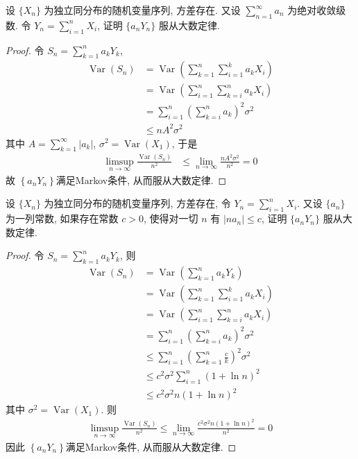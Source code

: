\documentclass[../main.tex]{subfiles}
\begin{document}
\begin{exercise}{}{}
设 $\{X_n\}$ 为独立同分布的随机变量序列, 方差存在. 又设 $\sum_{n=1}^\infty a_n$ 为绝对收敛级数. 令 $Y_n = \sum_{i=1}^n X_i$, 证明 $\{a_n Y_n\}$ 服从大数定律.
\end{exercise}
\begin{proof}
令 $S_{n}= \sum _{k= 1}^{n}a_{k}Y_{k}$, 
 $$ \begin{aligned} \operatorname{Var}\left(S_{n}\right)&= \operatorname{Var}\left(\sum _{k= 1}^{n}\sum _{i= 1}^{k}a_{k}X_{i}\right)\\&= \operatorname{Var}\left(\sum _{i= 1}^{n}\sum _{k= i}^{n}a_{k}X_{i}\right)\\&= \sum _{i= 1}^{n}\left(\sum _{k= i}^{n}a_{k}\right)^{2}\sigma ^{2}\\&\le n A^{2}\sigma ^{2}\end{aligned} $$
 其中 $A= \sum _{k= 1}^{\infty}\left| a_{k} \right|$, $\sigma ^{2}= \operatorname{Var}\left(X_{1}\right)$, 于是  
$$ \begin{aligned} \limsup_{n\to \infty}\frac{\operatorname{Var}\left(S_{n}\right) }{n^{2} } &\le \lim_{n\to \infty}\frac{nA^{2}\sigma ^{2} }{ n^{2}}= 0\end{aligned} $$ 
故 $\left\{ a_{n}Y_{n} \right\}$满足Markov条件, 从而服从大数定律.  
\end{proof}
\begin{exercise}{}{}
设 $\{X_n\}$ 为独立同分布的随机变量序列, 方差存在, 令 $Y_n = \sum_{i=1}^n X_i$. 又设 $\{a_n\}$ 为一列常数, 如果存在常数 $c > 0$, 使得对一切 $n$ 有 $|n a_n| \leqslant c$, 证明 $\{a_n Y_n\}$ 服从大数定律.
\end{exercise}
\begin{proof}
令 $S_{n}= \sum _{k= 1}^{n}a_{k}Y_{k}$, 则
 $$ \begin{aligned} \operatorname{Var}\left(S_{n}\right)&= \operatorname{Var}\left(\sum _{k= 1}^{n}a_{k}Y_{k}\right)\\&= \operatorname{Var}\left(\sum _{k= 1}^{n}\sum _{i= 1}^{k}a_{k}X_{i}\right)\\&= \operatorname{Var}\left(\sum _{i= 1}^{n}\sum _{k= i}^{n}a_{k}X_{i}\right)\\&= \sum _{i= 1}^{n}\left(\sum _{k= i}^{n}a_{k}\right)^{2}\sigma ^{2}\\&\le \sum _{i= 1}^{n}\left(\sum _{k= 1}^{n}\frac{c }{k }\right)^{2}\sigma ^{2}\\&\le c^{2}\sigma ^{2}\sum _{i= 1}^{n}\left(1+ \ln n\right)^{2}\\&\le c^{2}\sigma ^{2}n\left(1+ \ln n\right)^{2}\end{aligned} $$ 
其中 $\sigma ^{2}= \operatorname{Var}\left(X_1\right)$. 则 
 $$ \begin{aligned} \limsup_{n\to \infty}\frac{\operatorname{Var}\left(S_{n}\right) }{n^{2} }\le \lim_{n\to \infty}\frac{c^{2}\sigma ^{2}n \left(1+ \ln n\right)^{2}}{n^{2} }= 0 \end{aligned} $$
因此 $\left\{ a_{n}Y_{n} \right\}$满足Markov条件, 从而服从大数定律. 
\end{proof}
\end{document}
